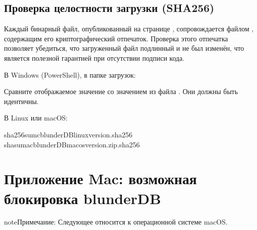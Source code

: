 \documentclass[letterpaper,10pt,russian]{sphinxmanual}
\begin{document}
\subsection{Проверка целостности загрузки (SHA256)}
\label{\detokenize{annexe_windows_securite:verifier-l-integrite-du-telechargement-sha256}}
\sphinxAtStartPar
Каждый бинарный файл, опубликованный на странице , сопровождается файлом , содержащим его криптографический отпечаток. Проверка этого отпечатка позволяет убедиться, что загруженный файл подлинный и не был изменён, что является полезной гарантией при отсутствии подписи кода.

\sphinxAtStartPar
В Windows (PowerShell), в папке загрузок:

\begin{sphinxVerbatim}[commandchars=\\\{\}]
   
\end{sphinxVerbatim}

\sphinxAtStartPar
Сравните отображаемое значение со значением из файла . Они должны быть идентичны.

\sphinxAtStartPar
В Linux или macOS:

\begin{sphinxVerbatim}[commandchars=\\\{\}]
sha256sum\PYGZhy{}cblunderDB\PYGZhy{}linux\PYGZhy{}\PYGZlt{}version\PYGZgt{}.sha256
shasum\PYGZhy{}a\PYGZhy{}cblunderDB\PYGZhy{}macos\PYGZhy{}\PYGZlt{}version\PYGZgt{}.zip.sha256
\end{sphinxVerbatim}

\sphinxstepscope


\section{Приложение Mac: возможная блокировка blunderDB}
\label{\detokenize{annexe_mac_securite:annexe-mac-blocage-eventuel-de-blunderdb}}\label{\detokenize{annexe_mac_securite:annexe-mac-malware}}\label{\detokenize{annexe_mac_securite::doc}}
\begin{sphinxadmonition}{note}{Примечание:}
\sphinxAtStartPar
Следующее относится к операционной системе macOS.
\end{sphinxadmonition}
\end{document}
